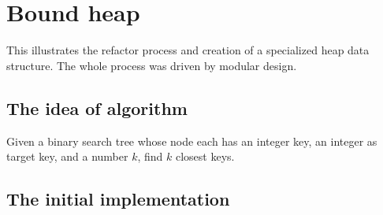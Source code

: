 
\chapter{Bound heap}\label{ch:boundHeap}

This illustrates the refactor process and creation of a specialized heap data structure.
The whole process was driven by modular design.

\section{The idea of algorithm}\label{sec:algorithm}

Given a binary search tree whose node each has an integer key, an integer as target key, and a
number $k$, find $k$ closest keys.

\section{The initial implementation}

\begin{minipage}{\linewidth}
    
\end{minipage}

\begin{minipage}{\linewidth}
    
    
\end{minipage}

